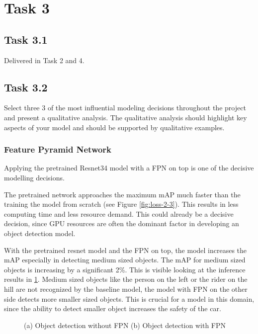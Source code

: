 \documentclass{article}
\begin{document}
\newpage
\section*{Task 3}

\subsection*{Task 3.1}
Delivered in Task 2 and 4.

\subsection*{Task 3.2}
Select three 3 of the most influential modeling decisions throughout the project and present a qualitative analysis. The qualitative analysis should highlight key aspects of your model and should be supported by qualitative
examples.

\subsubsection*{Feature Pyramid Network}
Applying the pretrained Resnet34 model with a FPN on top is one of the decisive modelling decisions.

The pretrained network approaches the maximum mAP much faster than the training the model from scratch (see Figure \ref{fig:loss-2-3}). This results in less computing time and less resource demand. This could already be a decisive decision, since GPU resources are often the dominant factor in developing an object detection model.

With the pretrained resnet model and the FPN on top, the model increases the mAP especially in detecting medium sized objects. The mAP for medium sized objects is increasing by a significant 2\%. This is visible looking at the inference results in \ref{fig:comparison1}. Medium sized objects like the person on the left or the rider on the hill are not recognized by the baseline model, the model with FPN on the other side detects more smaller sized objects. This is crucial for a model in this domain, since the ability to detect smaller object increases the safety of the car.

\begin{figure}[t!]
    \centering
    \label{fig:comparison1}
    \caption{(a) Object detection without FPN (b)  Object detection with FPN}
\end{figure}
\end{document}
